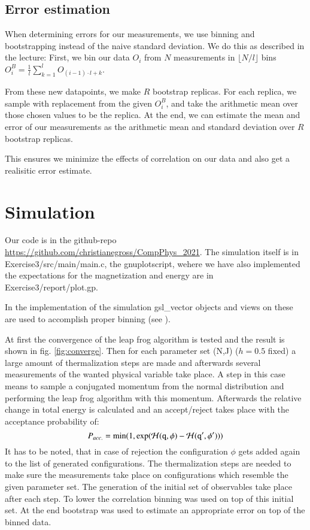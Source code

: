\documentclass{scrartcl}
\begin{document}
\subsection{Error estimation}
When determining errors for our measurements, we use binning and bootstrapping instead of the naive standard deviation. 
We do this as described in the lecture: First, we bin our data $O_i$ from $N$ measurements in $\lfloor N/l\rfloor$ bins $O^B_i=\frac{1}{l}\sum_{k=1}^l O_{(i-1)\cdot l+k}$. 

From these new datapoints, we make $R$ bootstrap replicas. For each replica, we sample with replacement from the given $O_i^B$, and take the arithmetic mean over those chosen values to be the replica. At the end, we can estimate the mean and error of our measurements as the arithmetic mean and standard deviation over $R$ bootstrap replicas.

This ensures we minimize the effects of correlation on our data and also get a realisitic error estimate.

\section{Simulation}
Our code is in the github-repo \url{https://github.com/christianegross/CompPhys\_2021}. The simulation itself is in Exercise3/src/main/main.c, the gnuplotscript, wehere we have also implemented the expectations for the magnetization and energy are in Exercise3/report/plot.gp.

In the implementation of the simulation gsl\_vector objects  and views on these are used to accomplish proper binning (see \cite{gsldoc_mat}). 

At first the convergence of the leap frog algorithm is tested and the result is shown in fig. \ref{fig:converge}. Then for each parameter set (N,J) ($h=0.5$ fixed) a large amount of thermalization steps are made and afterwards several measurements of the wanted physical variable take place. A step in this case means to sample a conjugated momentum from the normal distribution and performing the leap frog algorithm with this momentum. Afterwards the relative change in total energy is calculated and an accept/reject takes place with the acceptance probability of:
\begin{equation}
	P_{acc.}=\min(1,\exp(\cal{H} (\texttt{q},\phi)-\cal H (\texttt{q}',\phi')))
\end{equation} 
It has to be noted, that in case of rejection the configuration $\phi$ gets added again to the list of generated configurations.
The thermalization steps are needed to make sure the measurements take place on configurations which resemble the given parameter set. The generation of the initial set of observables take place after each step. To lower the correlation binning was used on top of this initial set. At the end bootstrap was used to estimate an appropriate error on top of the binned data.
\end{document}
